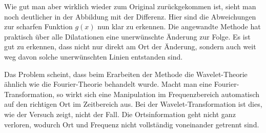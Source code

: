Wie gut man aber wirklich wieder zum Original zurückgekommen ist, sieht man noch deutlicher in der Abbildung mit der Differenz.
Hier sind die Abweichungen zur  scharfen Funktion $g(x)$ nun klar zu erkennen.
Die angewandte Methode hat praktisch über alle Dilatationen eine unerwünschte Änderung zur Folge.
Es ist gut zu erkennen, dass nicht nur direkt am Ort der Änderung, sondern auch \glqq weit \grqq{} weg davon solche unerwünschten Linien entstanden sind.

Das Problem scheint, dass beim Erarbeiten der Methode die Wavelet-Theorie ähnlich wie die Fourier-Theorie behandelt wurde.
Macht man eine Fourier-Transformation, so wirkt sich eine Manipulation im Frequenzbereich automatisch auf den richtigen Ort im Zeitbereich aus.
Bei der Wavelet-Transformation ist dies, wie der Versuch zeigt, nicht der Fall.
Die Ortsinformation geht nicht ganz verloren, wodurch Ort und Frequenz nicht vollständig voneinander getrennt sind.